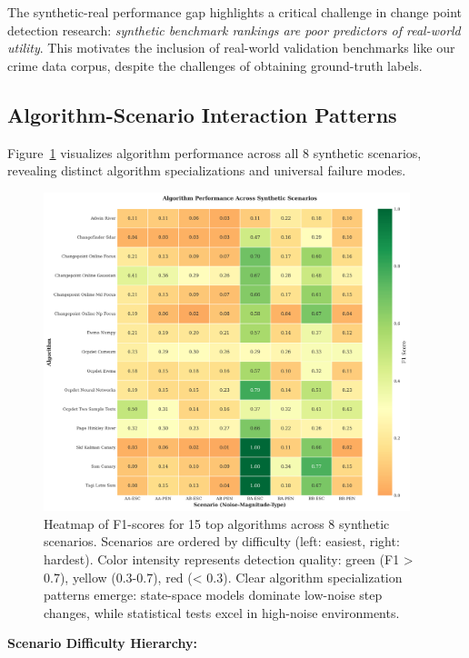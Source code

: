 \documentclass[journal,article,submit,pdftex,moreauthors]{Definitions/mdpi}
\begin{document}
The synthetic-real performance gap highlights a critical challenge in change point detection research: \textit{synthetic benchmark rankings are poor predictors of real-world utility}. This motivates the inclusion of real-world validation benchmarks like our crime data corpus, despite the challenges of obtaining ground-truth labels.


\subsection{Algorithm-Scenario Interaction Patterns}

Figure~\ref{fig:scenario_heatmap} visualizes algorithm performance across all 8 synthetic scenarios, revealing distinct algorithm specializations and universal failure modes.

\begin{figure}[H]
\centering
\includegraphics[width=0.95\textwidth]{figures/fig_scenario_heatmap.png}
\caption{Heatmap of F1-scores for 15 top algorithms across 8 synthetic scenarios. Scenarios are ordered by difficulty (left: easiest, right: hardest). Color intensity represents detection quality: green (F1 > 0.7), yellow (0.3-0.7), red (< 0.3). Clear algorithm specialization patterns emerge: state-space models dominate low-noise step changes, while statistical tests excel in high-noise environments.}
\label{fig:scenario_heatmap}
\end{figure}

\textbf{Scenario Difficulty Hierarchy:}
\end{document}
